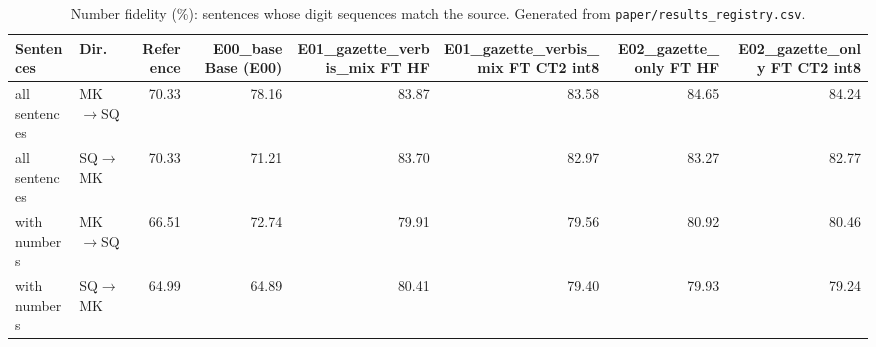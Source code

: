 \begin{table}[t]
\centering
\small
\begin{tabular}{llrrrrrr}
\toprule
Sentences & Dir. & Reference & E00\_base Base (E00) & E01\_gazette\_verbis\_mix FT HF & E01\_gazette\_verbis\_mix FT CT2 int8 & E02\_gazette\_only FT HF & E02\_gazette\_only FT CT2 int8 \\
\midrule
all sentences & MK$\rightarrow$SQ & 70.33 & 78.16 & 83.87 & 83.58 & 84.65 & 84.24 \\
all sentences & SQ$\rightarrow$MK & 70.33 & 71.21 & 83.70 & 82.97 & 83.27 & 82.77 \\
with numbers & MK$\rightarrow$SQ & 66.51 & 72.74 & 79.91 & 79.56 & 80.92 & 80.46 \\
with numbers & SQ$\rightarrow$MK & 64.99 & 64.89 & 80.41 & 79.40 & 79.93 & 79.24 \\
\bottomrule
\end{tabular}
\caption{Number fidelity (\%): sentences whose digit sequences match the source. Generated from \texttt{paper/results\_registry.csv}.}
\label{tab:number-fidelity}
\end{table}
